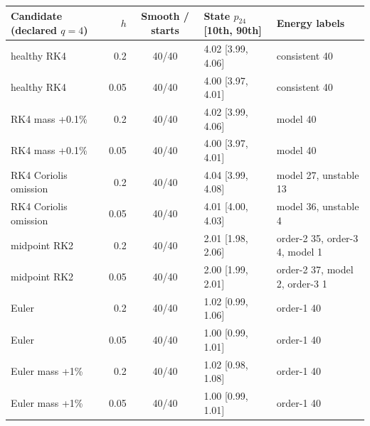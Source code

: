 \begin{tabular}{lrcll}
\toprule
Candidate (declared $q=4$) & $h$ & Smooth / starts & State $p_{24}$ [10th, 90th] & Energy labels \\
\midrule
healthy RK4 & 0.2 & 40/40 & 4.02 [3.99, 4.06] & consistent 40 \\
healthy RK4 & 0.05 & 40/40 & 4.00 [3.97, 4.01] & consistent 40 \\
RK4 mass +0.1\% & 0.2 & 40/40 & 4.02 [3.99, 4.06] & model 40 \\
RK4 mass +0.1\% & 0.05 & 40/40 & 4.00 [3.97, 4.01] & model 40 \\
RK4 Coriolis omission & 0.2 & 40/40 & 4.04 [3.99, 4.08] & model 27, unstable 13 \\
RK4 Coriolis omission & 0.05 & 40/40 & 4.01 [4.00, 4.03] & model 36, unstable 4 \\
midpoint RK2 & 0.2 & 40/40 & 2.01 [1.98, 2.06] & order-2 35, order-3 4, model 1 \\
midpoint RK2 & 0.05 & 40/40 & 2.00 [1.99, 2.01] & order-2 37, model 2, order-3 1 \\
Euler & 0.2 & 40/40 & 1.02 [0.99, 1.06] & order-1 40 \\
Euler & 0.05 & 40/40 & 1.00 [0.99, 1.01] & order-1 40 \\
Euler mass +1\% & 0.2 & 40/40 & 1.02 [0.98, 1.08] & order-1 40 \\
Euler mass +1\% & 0.05 & 40/40 & 1.00 [0.99, 1.01] & order-1 40 \\
\bottomrule
\end{tabular}
